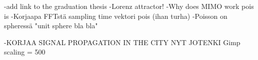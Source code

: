 -add link to the graduation thesis
-Lorenz attractor!
-Why does MIMO work pois is
-Korjaapa FFTstä sampling time vektori pois (ihan turha)
-Poisson on spheressä "unit sphere bla bla"

-KORJAA SIGNAL PROPAGATION IN THE CITY NYT JOTENKI
Gimp scaling = 500 
